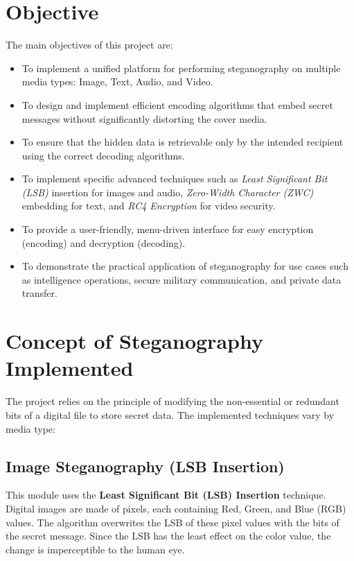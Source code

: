 \documentclass[12pt,a4paper]{report}
\begin{document}
\chapter{Objective}
The main objectives of this project are:
\begin{itemize}
    \item To implement a unified platform for performing steganography on multiple media types: Image, Text, Audio, and Video.
    \item To design and implement efficient encoding algorithms that embed secret messages without significantly distorting the cover media.
    \item To ensure that the hidden data is retrievable only by the intended recipient using the correct decoding algorithms.
    \item To implement specific advanced techniques such as \textit{Least Significant Bit (LSB)} insertion for images and audio, \textit{Zero-Width Character (ZWC)} embedding for text, and \textit{RC4 Encryption} for video security.
    \item To provide a user-friendly, menu-driven interface for easy encryption (encoding) and decryption (decoding).
    \item To demonstrate the practical application of steganography for use cases such as intelligence operations, secure military communication, and private data transfer.
\end{itemize}

\chapter{Concept of Steganography Implemented}
The project relies on the principle of modifying the non-essential or redundant bits of a digital file to store secret data. The implemented techniques vary by media type:

\section{Image Steganography (LSB Insertion)}
This module uses the \textbf{Least Significant Bit (LSB) Insertion} technique. Digital images are made of pixels, each containing Red, Green, and Blue (RGB) values. The algorithm overwrites the LSB of these pixel values with the bits of the secret message. Since the LSB has the least effect on the color value, the change is imperceptible to the human eye.
\end{document}
